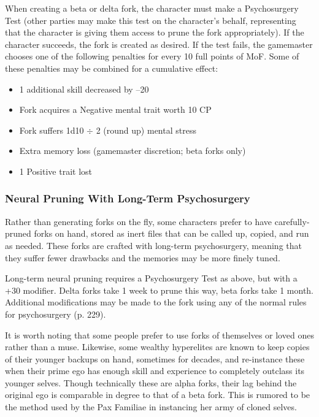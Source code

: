 When creating a beta or delta fork, the character must make a Psychosurgery Test (other parties may make this test on the character's behalf, representing that the character is giving them access to prune the fork appropriately). If the character succeeds, the fork is created as desired. If the test fails, the gamemaster chooses one of the following penalties for every 10 full points of MoF. Some of these penalties may be combined for a cumulative effect: 

\begin{itemize} \item 1 additional skill decreased by –20 \item Fork acquires a Negative mental trait worth 10 CP \item Fork suffers 1d10 $\div$ 2 (round up) mental stress \item Extra memory loss (gamemaster discretion; beta forks only) \item 1 Positive trait lost \end{itemize} 

\subsubsection{Neural Pruning With Long-Term Psychosurgery} 

Rather than generating forks on the fly, some characters prefer to have carefully-pruned forks on hand, stored as inert files that can be called up, copied, and run as needed. These forks are crafted with long-term psychosurgery, meaning that they suffer fewer drawbacks and the memories may be more finely tuned. 

Long-term neural pruning requires a Psychosurgery Test as above, but with a +30 modifier. Delta forks take 1 week to prune this way, beta forks take 1 month. Additional modifications may be made to the fork using any of the normal rules for psychosurgery (p. 229). 

It is worth noting that some people prefer to use forks of themselves or loved ones rather than a muse. Likewise, some wealthy hyperelites are known to keep copies of their younger backups on hand, sometimes for decades, and re-instance these when their prime ego has enough skill and experience to completely outclass its younger selves. Though technically these are alpha forks, their lag behind the original ego is comparable in degree to that of a beta fork. This is rumored to be the method used by the Pax Familiae in instancing her army of cloned selves. 

